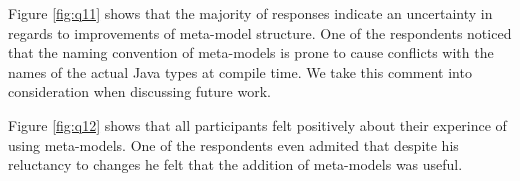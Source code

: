 \noindent Figure \ref{fig:q11} shows that the majority of responses indicate an uncertainty in regards to improvements of meta-model structure.
One of the respondents noticed that the naming convention of meta-models is prone to cause conflicts with the names of the actual Java types at compile time.
We take this comment into consideration when discussing future work.

\noindent Figure \ref{fig:q12} shows that all participants felt positively about their experince of using meta-models.
One of the respondents even admited that despite his reluctancy to changes he felt that the addition of meta-models was useful.
